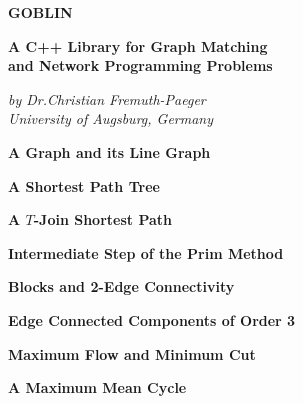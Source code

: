 \documentclass{report}
\begin{document}
\begin{center}
\Large

\vfill
{\bf\Huge GOBLIN}

\vspace{1cm}
{\bf A C++ Library for Graph Matching \\
and Network Programming Problems}

\vfill
{\it by Dr.Christian Fremuth-Paeger \\ University of Augsburg, Germany}
\vfill


\vfill
\epsfxsize=5cm
\epsfxsize=5cm
\hspace*{2cm}

\vspace{1cm}
{\bf A Graph and its Line Graph}
\vfill

\clearpage

\vfill
\epsfxsize=11cm

\vspace{1cm}
{\bf A Shortest Path Tree}
\vfill


\vfill
\epsfxsize=11cm

\vspace{1cm}
{\bf A $T$-Join Shortest Path}
\vfill

\clearpage

\vfill
\epsfxsize=10cm

\vspace{1cm}
{\bf Intermediate Step of the Prim Method}
\vfill


\vfill
\epsfxsize=8cm

\vspace{1cm}
{\bf Blocks and 2-Edge Connectivity}
\vfill

\clearpage

\vfill
\epsfxsize=12cm

\vspace{1cm}
{\bf Edge Connected Components of Order 3}
\vfill


\vfill
\epsfxsize=9cm

\vspace{1cm}
{\bf Maximum Flow and Minimum Cut}
\vfill

\clearpage

\vfill
\epsfxsize=11cm

\vspace{1cm}
{\bf A Maximum Mean Cycle}
\vfill



\end{center}
\end{document}
